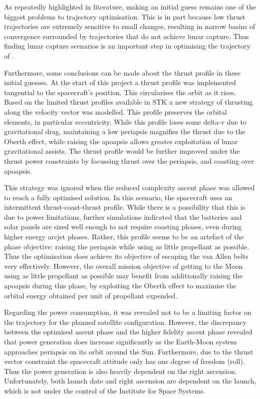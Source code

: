 As repeatedly highlighted in literature, making an initial guess remains one of the biggest problems to trajectory optimisation. This is in part because low thrust trajectories are extremely sensitive to small changes, resulting in narrow basins of convergence surrounded by trajectories that do not achieve lunar capture. Thus finding lunar capture scenarios is an important step in optimising the trajectory of \BW.

Furthermore, some conclusions can be made about the thrust profile in these initial guesses. At the start of this project a thrust profile was implemented tangential to the spacecraft's position. This circularises the orbit as it rises. Based on the limited thrust profiles available in STK a new strategy of thrusting along the velocity vector was modelled. This profile preserves the orbital elements, in particular eccentricity. While this profile loses some delta-v due to gravitational drag, maintaining a low periapsis magnifies the thrust due to the Oberth effect, while raising the apoapsis allows greater exploitation of lunar gravitational assists. The thrust profile would be further improved under the thrust power constraints by focussing thrust over the periapsis, and coasting over apoapsis.

This strategy was ignored when the reduced complexity ascent phase was allowed to reach a fully optimised solution. In this scenario, the spacecraft uses an intermittent thrust-coast-thrust profile. While there is a possibility that this is due to power limitations, further simulations indicated that the batteries and solar panels are sized well enough to not require coasting phases, even during higher energy arcjet phases. Rather, this profile seems to be an artefact of the phase objective: raising the periapsis while using as little propellant as possible. Thus the optimisation does achieve its objective of escaping the van Allen belts very effectively. However, the overall mission objective of getting to the Moon using as little propellant as possible may benefit from additionally raising the apoapsis during this phase, by exploiting the Oberth effect to maximise the orbital energy obtained per unit of propellant expended.

Regarding the power consumption, it was revealed not to be a limiting factor on the trajectory for the planned satellite configuration. However, the discrepancy between the optimised ascent phase and the higher fidelity ascent phase revealed that power generation does increase significantly as the Earth-Moon system approaches periapsis on its orbit around the Sun. Furthermore, due to the thrust vector constraint the spacecraft attitude only has one degree of freedom (roll). Thus the power generation is also heavily dependent on the right ascension. Unfortunately, both launch date and right ascension are dependent on the launch, which is not under the control of the Institute for Space Systems.






